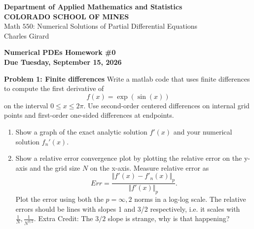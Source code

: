 \documentclass[12pt]{article}
\begin{document}
\begin{flushleft}
    \textbf{Department of Applied Mathematics and Statistics} \\
    \textbf{COLORADO SCHOOL OF MINES} \\
    Math $550$: Numerical Solutions of Partial Differential Equations \\
    Charles Girard

\end{flushleft}


\begin{center}
\bf{Numerical PDEs Homework \#0}\\
\bf{Due Tuesday, September 15, 2026}
\end{center}

\vspace{0.3cm}

\noindent \textbf{Problem 1: Finite differences}
Write a matlab code that uses finite differences to compute the first derivative of
$$f(x) = \exp(\sin(x))$$
on the interval $0 \leq x \leq 2\pi$. Use second-order centered differences on internal grid points and first-order one-sided differences at endpoints. 
\begin{enumerate}[label = (\alph*)]
    \item Show a graph of the exact analytic solution $f'(x)$ and your numerical solution $f_n'(x)$. 
    \item Show a relative error convergence plot by plotting the relative error on the y-axis and the grid size $N$ on the x-axis. Measure relative error as 
    $$Err = \frac{\Vert f'(x) - f'_n(x) \Vert_p}{\Vert f'(x) \Vert_p}.$$
    \noindent Plot the error using both the $p=\infty,2$ norms in a log-log scale. The relative errors should be lines with slopes 1 and 3/2 respectively, i.e. it scales with $\displaystyle \frac{1}{N}, \frac{1}{N^{3/2}}$. Extra Credit: The $3/2$ slope is strange, why is that happening?
\end{enumerate}
\end{document}
